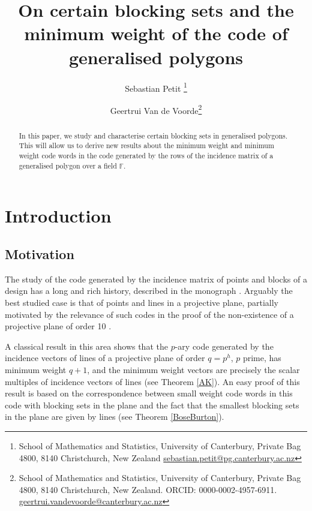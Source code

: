 \documentclass[12pt]{article}
\title{On certain blocking sets and the minimum weight of the code of generalised polygons}
\author{Sebastian Petit \thanks{School of Mathematics and Statistics, University of Canterbury, Private Bag 4800, 8140 Christchurch, New Zealand \href{mailto:sebastian.petit@pg.canterbury.ac.nz}{\url{sebastian.petit@pg.canterbury.ac.nz}}}
\and Geertrui Van de Voorde\thanks{School of Mathematics and Statistics, University of Canterbury, Private Bag 4800, 8140 Christchurch, New Zealand. ORCID: 0000-0002-4957-6911. \href{mailto:geertrui.vandevoorde@canterbury.ac.nz}{\url{geertrui.vandevoorde@canterbury.ac.nz}}}}
\date{}
\newcommand{\F}{\mathbb{F}}
\theoremstyle{remark}
\begin{document}
\maketitle
\begin{abstract}
In this paper, we study and characterise certain blocking sets in generalised polygons. This will allow us to derive new results about the minimum weight and minimum weight code words in the code generated by the rows of the incidence matrix of a  generalised polygon over a field \(\F\).
\end{abstract}








\section{Introduction}
\subsection{Motivation}
The study of the code generated by the incidence matrix of points and blocks of a design has a long and rich history, described in the monograph \cite{AssmusAndKey}. Arguably the best studied case is that of points and lines in a projective plane, partially motivated by the relevance of such codes in the proof of the non-existence of a projective plane of order 10 \cite{Lam}.

A classical result in this area shows that the $p$-ary code generated by the incidence vectors of lines of a projective plane of order $q=p^h$, $p$ prime, has minimum weight $q+1$, and the minimum weight vectors are precisely the scalar multiples of incidence vectors of lines (see Theorem \ref{AK}). An easy proof of this result is based on the correspondence between small weight code words in this code with blocking sets in the plane and the fact that the smallest blocking sets in the plane are given by lines (see Theorem \ref{BoseBurton}).
\end{document}
